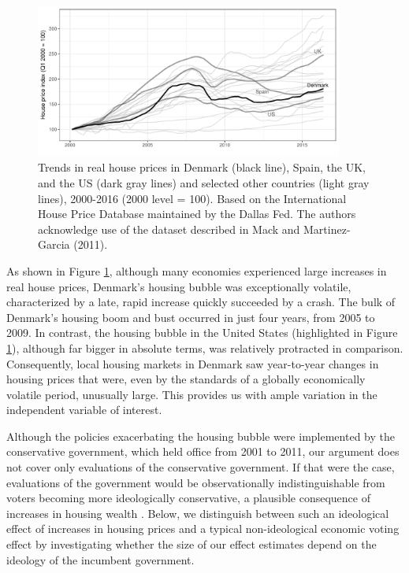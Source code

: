 \documentclass[12pt,a4paper]{article}
\begin{document}
	
	
	\begin{figure}[htbp!]
		\includegraphics[width=0.9\textwidth]{../figures/timeplot}
		\centering
		\caption{Trends in real house prices in Denmark (black line), Spain, the UK, and the US (dark gray lines) and selected other countries (light gray lines), 2000-2016 (2000 level = 100). Based on the International House Price Database maintained by the Dallas Fed. The authors acknowledge use of the dataset described in Mack and Martinez-Garcia (2011).}\label{hpd}
	\end{figure}
	
	As shown in Figure \ref{hpd}, although many economies experienced large increases in real house prices, Denmark's housing bubble was exceptionally volatile, characterized by a late, rapid increase quickly succeeded by a crash. The bulk of Denmark's housing boom and bust occurred in just four years, from 2005 to 2009. In contrast, the housing bubble in the United States (highlighted in Figure \ref{hpd}), although far bigger in absolute terms, was relatively protracted in comparison. Consequently, local housing markets in Denmark saw year-to-year changes in housing prices that were, even by the standards of a globally economically volatile period, unusually large. This provides us with ample variation in the independent variable of interest.
	
	
	Although the policies exacerbating the housing bubble were implemented by the conservative government, which held office from 2001 to 2011, our argument does not cover only evaluations of the conservative government. If that were the case, evaluations of the government would be observationally indistinguishable from voters becoming more ideologically conservative, a plausible consequence of increases in housing wealth \citep{ ansell2014political}. Below, we distinguish between such an ideological effect of increases in housing prices and a typical non-ideological economic voting effect by investigating whether the size of our effect estimates depend on the ideology of the incumbent government. 
	
\end{document}
